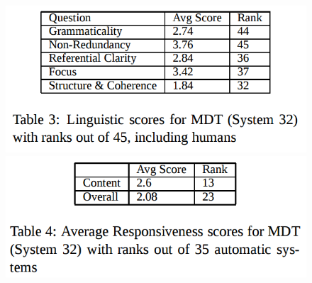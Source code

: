 \documentclass[xcolor={table}]{beamer}
\begin{document}
\begin{frame}[t]{\cite{zajic2006sentence}}
      \begin{figure}[h]
          \centering
      \includegraphics[scale=.25]{images/table3-zajic06.png} \\
      \includegraphics[scale=.25]{images/table4-zajic06.png} \\
  \end{figure}
\end{frame}
\end{document}
